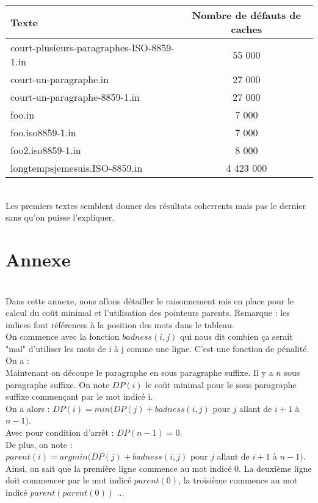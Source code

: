 \documentclass{article}
\begin{document}
\begin{tabular}{|l|c|}
  \hline
  Texte & Nombre de d\'efauts de caches \\
  \hline
  court-plusieurs-paragraphes-ISO-8859-1.in &  55 000\\
  court-un-paragraphe.in & 27 000 \\
  court-un-paragraphe-8859-1.in & 27 000\\
  foo.in & 7 000\\
  foo.iso8859-1.in & 7 000 \\
  foo2.iso8859-1.in & 8 000 \\
  longtempsjemesuis.ISO-8859.in & 4 423 000 \\
  \hline
\end{tabular}
\\
Les premiers textes semblent donner des r\'esultats coherrents mais pas le dernier sans qu'on puisse l'expliquer.

\section{Annexe}
\\
Dans cette annexe, nous allons détailler le raisonnement mis en place pour le calcul du co\^ut minimal et l'utilisation des pointeurs parents. Remarque : les indices font r\'ef\'erences à la position des mots dans le tableau.\\
On commence avec la fonction $badness(i, j)$ qui nous dit combien ça serait "mal" d'utiliser les mots de i à j comme une ligne. C'est une fonction de p\'enalité. \\
On a : \\
%
Maintenant on découpe le paragraphe en sous paragraphe suffixe. Il y a $n$ sous paragraphe suffixe. On note $DP(i)$ le coût minimal pour le sous paragraphe suffixe commençant par le mot indicé i. \\ On a alors :
$DP(i) = min( DP(j) + badness(i, j) $ pour $j$ allant de $i+1 $ à $ n - 1)$. \\ Avec pour condition d'arrêt : $DP(n-1) = 0$. \\
De plus, on note : \\
$parent(i) = argmin ( DP(j) + badness(i, j) $ pour $j$ allant de $i+1 $ à $ n - 1)$. \\
Ainsi, on sait que la première ligne commence au mot indicé 0. La deuxième ligne doit commencer par le mot indicé $parent(0)$, la troisième commence au mot indicé $parent(parent(0))$ ... \\
\end{document}
